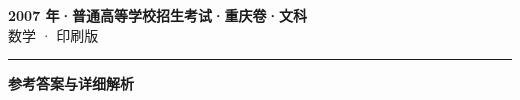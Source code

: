 \documentclass[zihao=5, a4paper]{ctexart}
\begin{document}
\begin{center}
  {\Large\bfseries 2007 年·普通高等学校招生考试·重庆卷·文科}\\[4pt]
  {\large 数学 · 印刷版}
\end{center}
\medskip
{}

\par\bigskip\hrule\bigskip
{}
\begin{center}{\large\bfseries 参考答案与详细解析}\end{center}
\smallskip

\end{document}
